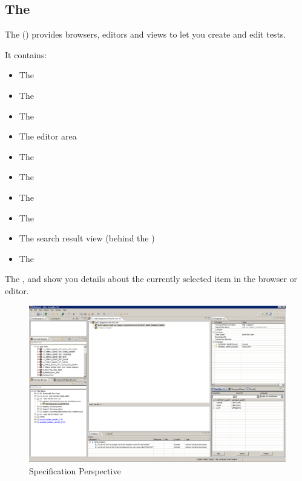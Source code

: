\subsection{The \specpersp{}}
The \specpersp{} () provides browsers, editors and views to let you create and edit tests.

It contains:

\begin{itemize}
\item The \gdtestsuitebrowser{} 
\item The \gdtestcasebrowser{} 
\item The \gdcompnamebrowser{} 
\item The editor area 
\item The \gdpropview{} 
\item The \gddatasetsview{} 
\item The \gdcompnamesview{} 
\item The \gdprobview{} 
\item The search result view (behind the \gdprobview{})
\item The \gdrunautview{}
\end{itemize}

The \gdcompnamesview{}, \gddatasetsview{} and \gdpropview{} show you details about the currently selected item in the browser or editor. 

\begin{figure}
\includegraphics[width=12.5cm]{Userinterface/Editors/PS/client}
\caption{\app{} Specification Perspective}
\label{clientwindow}
\end{figure}


